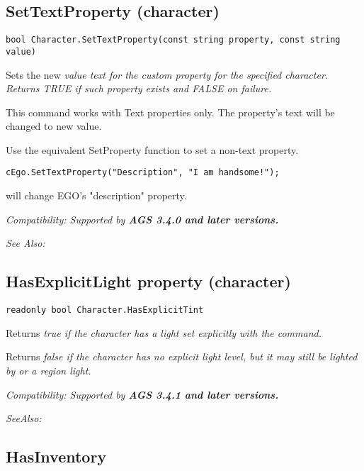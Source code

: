 \subsection{SetTextProperty (character)}\label{Character.SetTextProperty}%

\begin{verbatim}
bool Character.SetTextProperty(const string property, const string value)
\end{verbatim}
Sets the new \it{value} text for the custom \it{property} for the specified character. Returns
TRUE if such property exists and FALSE on failure.

This command works with Text properties only. The property's text will be
changed to new value.

Use the equivalent SetProperty function to set a non-text property.

\begin{verbatim}
cEgo.SetTextProperty("Description", "I am handsome!");
\end{verbatim}
will change EGO's "description" property.

\it{Compatibility:} Supported by \bf{AGS 3.4.0} and later versions.

\it{See Also:} 


\subsection{HasExplicitLight property (character)}\label{Character.HasExplicitLight}%

\begin{verbatim}
readonly bool Character.HasExplicitTint
\end{verbatim}
Returns \it{true} if the character has a light set explicitly with the
 command.

Returns \it{false} if the character has no explicit light level, but it may still be
lighted by  or a region light.

\it{Compatibility:} Supported by \bf{AGS 3.4.1} and later versions.

\it{SeeAlso:} 


\subsection{HasInventory}\label{Character.HasInventory}%

